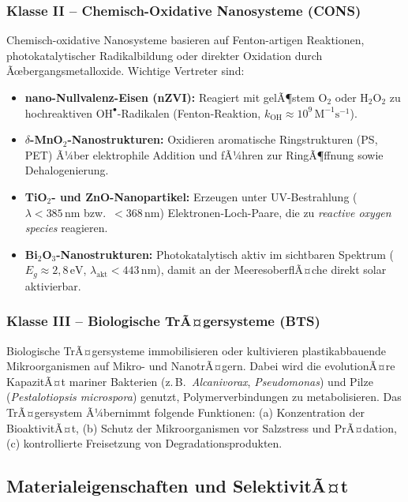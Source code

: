 ﻿\documentclass[12pt,a4paper]{article}
\theoremstyle{definition}
\theoremstyle{remark}
\newcommand{\ROS}{\textit{reactive oxygen species}}
\begin{document}
\subsubsection{Klasse II -- Chemisch-Oxidative Nanosysteme (CONS)}

Chemisch-oxidative Nanosysteme basieren auf Fenton-artigen Reaktionen,
photokatalytischer Radikalbildung oder direkter Oxidation durch Ãœbergangsmetalloxide.
Wichtige Vertreter sind:

\begin{itemize}
  \item \textbf{nano-Nullvalenz-Eisen (nZVI):} Reagiert mit gelÃ¶stem O$_2$ oder
        H$_2$O$_2$ zu hochreaktiven $\text{OH}^\bullet$-Radikalen
        (Fenton-Reaktion, $k_{\text{OH}} \approx 10^9\,\text{M}^{-1}\text{s}^{-1}$).
  \item \textbf{$\delta$-MnO$_2$-Nanostrukturen:} Oxidieren aromatische
        Ringstrukturen (PS, PET) Ã¼ber elektrophile Addition und fÃ¼hren zur
        RingÃ¶ffnung sowie Dehalogenierung.
  \item \textbf{TiO$_2$- und ZnO-Nanopartikel:} Erzeugen unter UV-Bestrahlung
        ($\lambda < 385\,\text{nm}$ bzw.\ $< 368\,\text{nm}$) Elektronen-Loch-Paare,
        die zu \ROS{} reagieren.
  \item \textbf{Bi$_2$O$_3$-Nanostrukturen:} Photokatalytisch aktiv im
        sichtbaren Spektrum ($E_g \approx 2{,}8\,\text{eV}$,
        $\lambda_{\text{akt}} < 443\,\text{nm}$), damit an der MeeresoberflÃ¤che
        direkt solar aktivierbar.
\end{itemize}

\subsubsection{Klasse III -- Biologische TrÃ¤gersysteme (BTS)}

Biologische TrÃ¤gersysteme immobilisieren oder kultivieren plastikabbauende
Mikroorganismen auf Mikro- und NanotrÃ¤gern. Dabei wird die evolutionÃ¤re KapazitÃ¤t
mariner Bakterien (z.\,B.\ \textit{Alcanivorax}, \textit{Pseudomonas}) und
Pilze (\textit{Pestalotiopsis microspora}) genutzt, Polymerverbindungen zu
metabolisieren. Das TrÃ¤gersystem Ã¼bernimmt folgende Funktionen:
(a) Konzentration der BioaktivitÃ¤t, (b) Schutz der Mikroorganismen vor
Salzstress und PrÃ¤dation, (c) kontrollierte Freisetzung von Degradationsprodukten.

\subsection{Materialeigenschaften und SelektivitÃ¤t}
\end{document}
